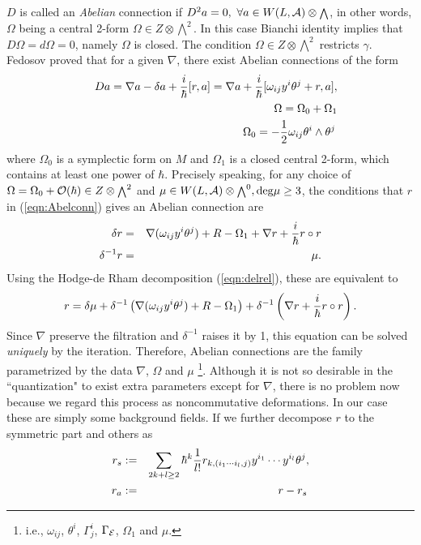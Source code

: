 \documentclass[10pt,a4paper]{article}
\def\h{\hbar}
\begin{document}
$D$ is called an {\it Abelian} connection if $D^2a=0,\ \forall a\in W(L,{\cal A})\otimes {\scriptstyle \bigwedge}$, in other words, $\Omega$ being a central 2-form $\Omega\in Z\otimes {\scriptstyle \bigwedge}^2$. In this case Bianchi identity implies that $D\Omega=d\Omega=0$, namely $\Omega$ is closed. The condition $\Omega\in Z\otimes {\scriptstyle \bigwedge}^2$ restricts  $\gamma$.
Fedosov proved that for a given $\nabla$, there exist Abelian connections of the form
\begin{eqnarray}
\label{eqn:Abelconn}
&&Da=\nabla a-\delta a+{i\over\h}[r,a]=\nabla a+{i\over\h}[\omega_{ij}y^i\theta^j+r,a], \nonumber\\
&&\Omega=\Omega_0+\Omega_1 \nonumber\\
&&\Omega_0=-{1\over2}\omega_{ij}\theta^i\wedge\theta^j \, 
\end{eqnarray}
where $\Omega_0$ is a symplectic form on $M$ and $\Omega_1$ is a closed central 2-form, which contains at least one power of $\h$. Precisely speaking, for any choice of $\Omega=\Omega_0+{\cal O}(\h)\in Z\otimes {\scriptstyle \bigwedge}^2$ and $\mu\in W(L,{\cal A})\otimes {\scriptstyle \bigwedge}^0, {\rm deg} \mu\geq3$, the conditions that
$r$ in (\ref{eqn:Abelconn}) gives an Abelian connection are 
\begin{eqnarray}
\label{eqn:rimu}
\delta r&=&\nabla(\omega_{ij}y^i\theta^j)+R-\Omega_1+\nabla r+{i\over\h}r\circ r\nonumber\\
\delta^{-1}r&=&\mu.
\end{eqnarray}
Using the Hodge-de Rham decomposition (\ref{eqn:delrel}), these are equivalent to
\begin{equation}
\label{eqn:rita}
r=\delta\mu+\delta^{-1}\left(\nabla(\omega_{ij}y^i\theta^j)+R-\Omega_1\right)+\delta^{-1}\left(\nabla r+{i\over\h}r\circ r\right).
\end{equation}
Since $\nabla$ preserve the filtration and $\delta^{-1}$ raises it by 1, this equation can be solved {\it uniquely} by the iteration. Therefore, Abelian connections are the family parametrized by the data $\nabla$, $\Omega$ and $\mu$
\footnote{i.e., $\omega_{ij}$, $\theta^i$, $\Gamma^i_j$, $\Gamma_{\cal E}$, $\Omega_1$ and $\mu$.}.
Although it is not so desirable in the ``quantization" to exist extra parameters except for $\nabla$, there is no problem now because we regard this process as noncommutative deformations. In our case these are simply some background fields. If we further decompose $r$ to the symmetric part and others as
\begin{eqnarray}
r_s&:=&\sum_{2k+l\geq2}\h^k{1\over l!}r_{k,(i_1\cdots i_l,j)}y^{i_1}\cdots y^{i_l}\theta^j,\nonumber\\
r_a&:=&r-r_s \,
\end{eqnarray}
\end{document}
